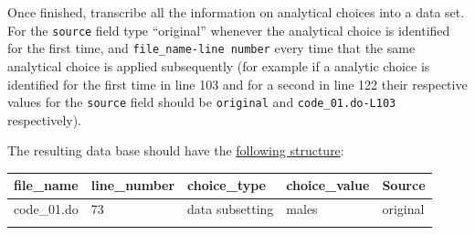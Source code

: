 \documentclass[]{book}
\begin{document}
Once finished, transcribe all the information on analytical choices into a data set. For the \texttt{source} field type ``original'' whenever the analytical choice is identified for the first time, and \texttt{file\_name-line\ number} every time that the same analytical choice is applied subsequently (for example if a analytic choice is identified for the first time in line 103 and for a second in line 122 their respective values for the \texttt{source} field should be \texttt{original} and \texttt{code\_01.do-L103} respectively).

The resulting data base should have the \href{https://docs.google.com/spreadsheets/d/1nZuJSHswbZgaaIfBcyIUGPwG-WIP8zE1Oambud-WoDc/edit?usp=sharing}{following structure}:

\begin{longtable}[]{@{}lllll@{}}
\toprule
\begin{minipage}[b]{0.10\columnwidth}\raggedright
file\_name\strut
\end{minipage} & \begin{minipage}[b]{0.11\columnwidth}\raggedright
line\_number\strut
\end{minipage} & \begin{minipage}[b]{0.18\columnwidth}\raggedright
choice\_type\strut
\end{minipage} & \begin{minipage}[b]{0.28\columnwidth}\raggedright
choice\_value\strut
\end{minipage} & \begin{minipage}[b]{0.18\columnwidth}\raggedright
Source\strut
\end{minipage}\tabularnewline
\midrule
\endhead
\begin{minipage}[t]{0.10\columnwidth}\raggedright
code\_01.do\strut
\end{minipage} & \begin{minipage}[t]{0.11\columnwidth}\raggedright
73\strut
\end{minipage} & \begin{minipage}[t]{0.18\columnwidth}\raggedright
data subsetting\strut
\end{minipage} & \begin{minipage}[t]{0.28\columnwidth}\raggedright
males\strut
\end{minipage} & \begin{minipage}[t]{0.18\columnwidth}\raggedright
original\strut
\end{minipage}\tabularnewline
\begin{minipage}[t]{0.10\columnwidth}\raggedright

\end{minipage}
\end{longtable}
\end{document}
